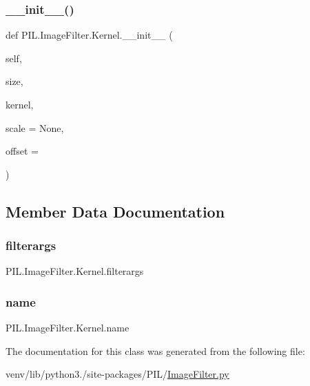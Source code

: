 \subsubsection{\texorpdfstring{\+\_\+\+\_\+init\+\_\+\+\_\+()}{\_\_init\_\_()}}
{\footnotesize\ttfamily def P\+I\+L.\+Image\+Filter.\+Kernel.\+\_\+\+\_\+init\+\_\+\+\_\+ (\begin{DoxyParamCaption}\item[{}]{self,  }\item[{}]{size,  }\item[{}]{kernel,  }\item[{}]{scale = {\ttfamily None},  }\item[{}]{offset = {} }\end{DoxyParamCaption})}



\subsection{Member Data Documentation}
\mbox{\label{classPIL_1_1ImageFilter_1_1Kernel_a78ad87516bd9305e73e3cf29833d6798}} 
\subsubsection{\texorpdfstring{filterargs}{filterargs}}
{\footnotesize\ttfamily P\+I\+L.\+Image\+Filter.\+Kernel.\+filterargs}

\mbox{\label{classPIL_1_1ImageFilter_1_1Kernel_a050f629ac6768fc467a138b307896991}} 
\subsubsection{\texorpdfstring{name}{name}}
{\footnotesize\ttfamily P\+I\+L.\+Image\+Filter.\+Kernel.\+name\hspace{0.3cm}{\ttfamily [static]}}



The documentation for this class was generated from the following file\+:\begin{DoxyCompactItemize}
\item 
venv/lib/python3./site-\/packages/\+P\+I\+L/\hyperlink{ImageFilter_8py}{Image\+Filter.\+py}\end{DoxyCompactItemize}
